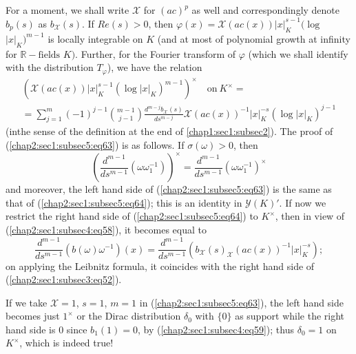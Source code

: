 \subsection{}\label{chap2:sec1:subsec5} %

 For a moment, we shall write $\mathcal{X}$ for $(ac)^{p}$ as well and
 correspondingly denote $b_{p}(s)$ as $b_{\mathcal{X}}(s)$. If $Re(s)>0$,
 then $\varphi(x)=\mathcal{X}(ac(x))|x|_{K}^{s-1}(\log$ $|x|_{K})^{m-1}$
 is locally integrable on $K$ (and at most of polynomial growth at
 infinity for $\mathbb{R}-\text{fields }K)$. Further, for the Fourier
 transform of $\varphi$ (which we shall identify with the distribution
 $T_{\varphi}$), we have the relation
\begin{gather*}
(\mathcal{X}(ac(x))|x|_{K}^{s-1}(\log|x|_{K})^{m-1})^{\times}\quad
  \text{on}~K^\times =\tag{63}\label{chap2:sec1:subsec5:eq63}\\
  =\sum\limits_{j=1}^{m}(-1)^{j-1}\binom{m-1}{j-1}\frac{d^{m-j}
    b_{\mathcal{X}}(s)}{ds^{m-j}} \mathcal{X}(ac(x))^{-1}|x|_{K}^{-s}
  (\log|x|_{K})^{j-1}
\end{gather*}
(in\pageoriginale the sense of the definition at the end of
\ref{chap1:sec1:subsec2}). The proof of 
(\ref{chap2:sec1:subsec5:eq63}) is as follows. If $\sigma(\omega)>0$, then 
\begin{equation*}
  \left(\frac{d^{m-1}}{ds^{m-1}}(\omega\omega_{1}^{-1})\right)^{\times}
  =\frac{d^{m-1}}{ds^{m-1}}(\omega\omega_{1}^{-1})^{\times}\tag{64}\label{chap2:sec1:subsec5:eq64} 
\end{equation*}
and moreover, the left hand side of (\ref{chap2:sec1:subsec5:eq63}) is
the same as that of 
(\ref{chap2:sec1:subsec5:eq64}); this is an identity in $\mathscr{Y}(K)'$. If now we restrict
the right hand side of (\ref{chap2:sec1:subsec5:eq64}) to
$K^{\times}$, then in view of (\ref{chap2:sec1:subsec4:eq58}), it
becomes equal to  
\begin{equation*}
\frac{d^{m-1}}{ds^{m-1}}(b(\omega)\omega^{-1})(x)=\frac{d^{m-1}}{ds^{m-1}}(b_{\mathcal{X}}(s)_{\mathcal{X}}(ac(x))^{-1}|x|_{K}^{-s});
\end{equation*}
 on applying the Leibnitz formula, it coincides with the right hand
 side of (\ref{chap2:sec1:subsec3:eq52}). 
 
 If we take $\mathcal{X}=1$, $s=1$, $m=1$ in
 (\ref{chap2:sec1:subsec5:eq63}), the left hand 
 side becomes just $1^{\times}$ or the Dirac distribution $\delta_{0}$
 with $\{0\}$ as support while the right hand side is $0$ since
 $b_{1}(1)=0$, by (\ref{chap2:sec1:subsec4:eq59}); thus $\delta_{0}=1$ on $K^{\times}$, which is
 indeed true!

